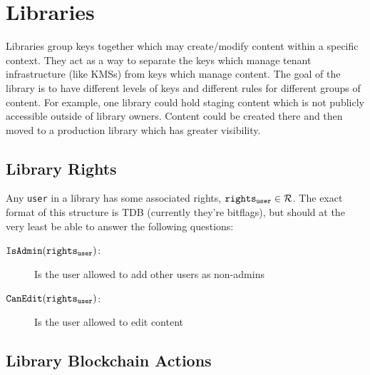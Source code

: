 
\section{Libraries}
Libraries group keys together which may create/modify content within a specific context. 
They act as a way to separate the keys which manage tenant infrastructure (like KMSs) from keys which manage content.
The goal of the library is to have different levels of keys and different rules for different groups of content.
For example, one library could hold staging content which is not publicly accessible outside of library owners.
Content could be created there and then moved to a production library which has greater visibility.

\subsection{Library Rights}
Any \texttt{user} in a library has some associated rights, $\mathtt{rights_{user}} \in \mathcal{R}$. 
The exact format of this structure is TDB (currently they're bitflags), but should at the very least be able to answer the following questions:

\begin{description}
  \item[$\mathtt{IsAdmin}(\mathtt{rights_{user}})$:] Is the user allowed to add other users as non-admins
  \item[$\mathtt{CanEdit}(\mathtt{rights_{user}})$:]  Is the user allowed to edit content
\end{description}

\subsection{Library Blockchain Actions}

